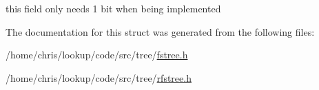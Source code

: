 this field only needs 1 bit when being implemented 



The documentation for this struct was generated from the following files\-:\begin{DoxyCompactItemize}
\item 
/home/chris/lookup/code/src/tree/\hyperlink{fstree_8h}{fstree.\-h}\item 
/home/chris/lookup/code/src/tree/\hyperlink{rfstree_8h}{rfstree.\-h}\end{DoxyCompactItemize}
